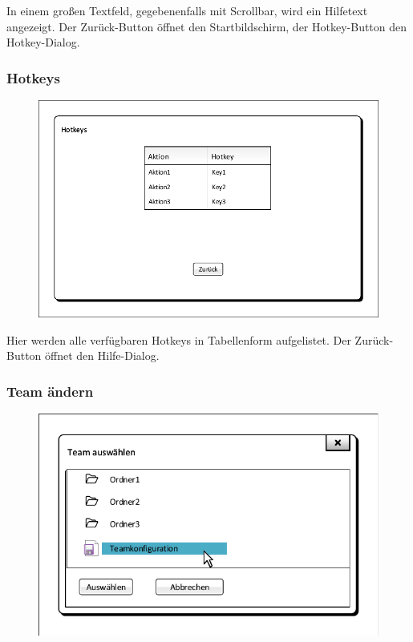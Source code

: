 In einem großen Textfeld, gegebenenfalls mit Scrollbar, wird ein Hilfetext angezeigt. Der \glqq{}Zurück\grqq{}-Button öffnet den Startbildschirm, der \glqq{}Hotkey\grqq{}-Button den Hotkey-Dialog.

\subsubsection{Hotkeys}
\begin{figure}[H]
	\centering
	\includegraphics[scale=0.8]{images/Hotkeys.pdf}
\end{figure}

Hier werden alle verfügbaren Hotkeys in Tabellenform aufgelistet. Der \glqq{}Zurück\grqq{}-Button öffnet den Hilfe-Dialog.

\subsubsection{Team ändern}
\begin{figure}[H]
	\centering
	\includegraphics[scale=0.8]{images/Teamauswahl_Popup.pdf}
\end{figure}

